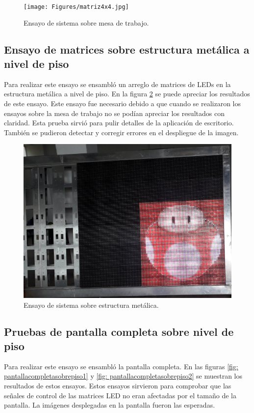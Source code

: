 \begin{figure}[htpb]
	\centering
	\texttt{[image: Figures/matriz4x4.jpg]} 
	\caption{Ensayo de sistema sobre mesa de trabajo.}
	\label{fig: matriz4x4}
\end{figure}

\subsection{Ensayo de matrices sobre estructura metálica a nivel de piso}
Para realizar este ensayo se ensambló un arreglo de matrices de LEDs en la estructura metálica a nivel de piso. En la figura \ref{fig: matrizestructuraparcial} se puede apreciar los resultados de este ensayo. Este ensayo fue necesario debido a que cuando se realizaron los ensayos sobre la mesa de trabajo no se podían apreciar los resultados con claridad. Esta prueba sirvió para pulir detalles de la aplicación de escritorio. También se pudieron detectar y corregir errores en el despliegue de la imagen.

\begin{figure}[htpb]
	\centering
	\includegraphics[scale=0.1]{Figures/matrizsobreestructura.jpg} 
	\caption{Ensayo de sistema sobre estructura metálica.}
	\label{fig: matrizestructuraparcial}
\end{figure}

\subsection{Pruebas de pantalla completa sobre nivel de piso}
Para realizar este ensayo se ensambló la pantalla completa. En las figuras \ref{fig: pantallacompletasobrepiso1} y \ref{fig: pantallacompletasobrepiso2} se muestran los resultados de estos ensayos. Estos ensayos sirvieron para comprobar que las señales de control de las matrices LED no eran afectadas por el tamaño de la pantalla. La imágenes desplegadas en la pantalla fueron las esperadas.

